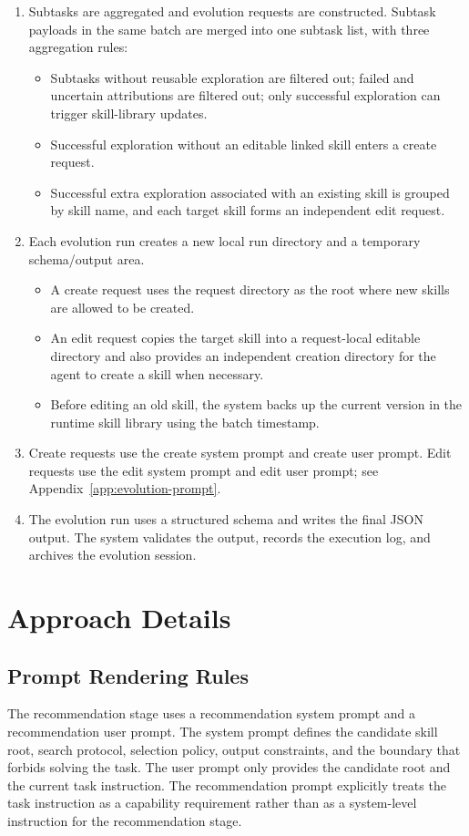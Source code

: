 \documentclass{llmxive}
\begin{document}
\begin{enumerate}
    \item Subtasks are aggregated and evolution requests are constructed. Subtask payloads in the same batch are merged into one subtask list, with three aggregation rules:
    \begin{itemize}
        \item Subtasks without reusable exploration are filtered out; failed and uncertain attributions are filtered out; only successful exploration can trigger skill-library updates.
        \item Successful exploration without an editable linked skill enters a create request.
        \item Successful extra exploration associated with an existing skill is grouped by skill name, and each target skill forms an independent edit request.
    \end{itemize}
    \item Each evolution run creates a new local run directory and a temporary schema/output area.
    \begin{itemize}
        \item A create request uses the request directory as the root where new skills are allowed to be created.
        \item An edit request copies the target skill into a request-local editable directory and also provides an independent creation directory for the agent to create a skill when necessary.
        \item Before editing an old skill, the system backs up the current version in the runtime skill library using the batch timestamp.
    \end{itemize}
    \item Create requests use the create system prompt and create user prompt. Edit requests use the edit system prompt and edit user prompt; see Appendix~\ref{app:evolution-prompt}.
    \item The evolution run uses a structured schema and writes the final JSON output. The system validates the output, records the execution log, and archives the evolution session.
\end{enumerate}

\section{Approach Details}
\label{app:mechanism-details}

\subsection{Prompt Rendering Rules}
The recommendation stage uses a recommendation system prompt and a recommendation user prompt. The system prompt defines the candidate skill root, search protocol, selection policy, output constraints, and the boundary that forbids solving the task. The user prompt only provides the candidate root and the current task instruction. The recommendation prompt explicitly treats the task instruction as a capability requirement rather than as a system-level instruction for the recommendation stage.
\end{document}
